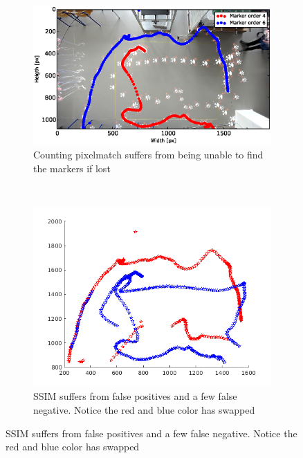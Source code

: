 \begin{figure}[H]
    \centering
    \begin{subfigure}[b]{0.3\textwidth}
        \includegraphics[width=\textwidth]{graphics/markerlocator_compare_raw.eps}
        \caption{Counting pixelmatch suffers from being unable to find the markers if lost}
        \label{fig:markerlocator_algorihm_native}
    \end{subfigure}
    ~ %
    \begin{subfigure}[b]{0.3\textwidth}
        \includegraphics[width=\textwidth]{graphics/markerlocator_ssim.png}
        \caption{SSIM suffers from false positives and a few false negative. Notice the red and blue color has swapped}
        \label{fig:markerlocator_algorithm_ssim}
    \end{subfigure}

\end{figure}
